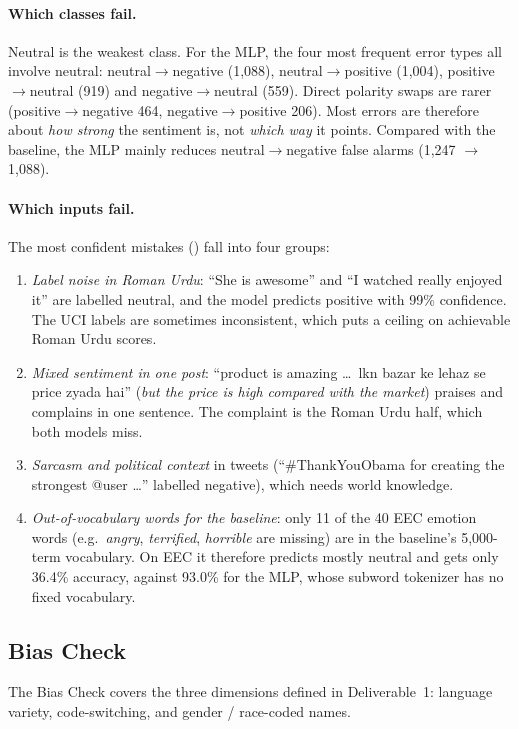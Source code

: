 \documentclass[11pt,a4paper]{article}
\begin{document}
\paragraph{Which classes fail.} Neutral is the weakest class. For the MLP, the four most
frequent error types all involve neutral: neutral$\to$negative (1,088), neutral$\to$positive
(1,004), positive$\to$neutral (919) and negative$\to$neutral (559). Direct polarity swaps are
rarer (positive$\to$negative 464, negative$\to$positive 206). Most errors are therefore about
\emph{how strong} the sentiment is, not \emph{which way} it points. Compared with the baseline,
the MLP mainly reduces neutral$\to$negative false alarms (1,247 $\to$ 1,088).

\paragraph{Which inputs fail.} The most confident mistakes ()
fall into four groups:
\begin{enumerate}
  \item \emph{Label noise in Roman Urdu}: ``She is awesome'' and ``I watched really enjoyed it''
        are labelled neutral, and the model predicts positive with 99\% confidence. The UCI
        labels are sometimes inconsistent, which puts a ceiling on achievable Roman Urdu scores.
  \item \emph{Mixed sentiment in one post}: ``product is amazing \ldots\ lkn bazar ke lehaz se price
        zyada hai'' (\emph{but the price is high compared with the market}) praises and
        complains in one sentence. The complaint is the Roman Urdu half, which both models
        miss.
  \item \emph{Sarcasm and political context} in tweets (``\#ThankYouObama for creating the
        strongest @user \ldots'' labelled negative), which needs world knowledge.
  \item \emph{Out-of-vocabulary words for the baseline}: only 11 of the 40 EEC emotion words
        (e.g.\ \emph{angry}, \emph{terrified}, \emph{horrible} are missing) are in the
        baseline's 5,000-term vocabulary. On EEC it therefore predicts mostly neutral and gets
        only 36.4\% accuracy, against 93.0\% for the MLP, whose subword tokenizer has no
        fixed vocabulary.
\end{enumerate}

\subsection{Bias Check}
The Bias Check covers the three dimensions defined in Deliverable~1: language variety,
code-switching, and gender / race-coded names.
\end{document}
